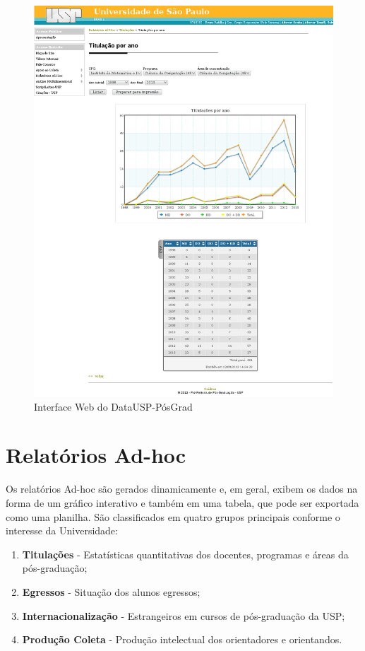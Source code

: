 \begin{figure}[H]\centering
  \caption{Interface Web do DataUSP-PósGrad}\label{fig:tit}
  \centerline{\includegraphics[width=\textwidth]{figuras/telatitulo.png}}
\end{figure}

\section{Relatórios Ad-hoc}

Os relatórios Ad-hoc são gerados dinamicamente e, em geral, exibem os dados na forma de um gráfico interativo e também em uma tabela, que pode ser exportada como uma planilha. São classificados em quatro grupos principais conforme o interesse da Universidade:

\begin{enumerate}
\item \textbf{Titulações} - Estatísticas quantitativas dos docentes, programas e áreas da pós-graduação;
\item \textbf{Egressos} - Situação dos alunos egressos;
\item \textbf{Internacionalização} - Estrangeiros em cursos de pós-graduação da USP;
\item \textbf{Produção Coleta} - Produção intelectual dos orientadores e orientandos.
\end{enumerate}

